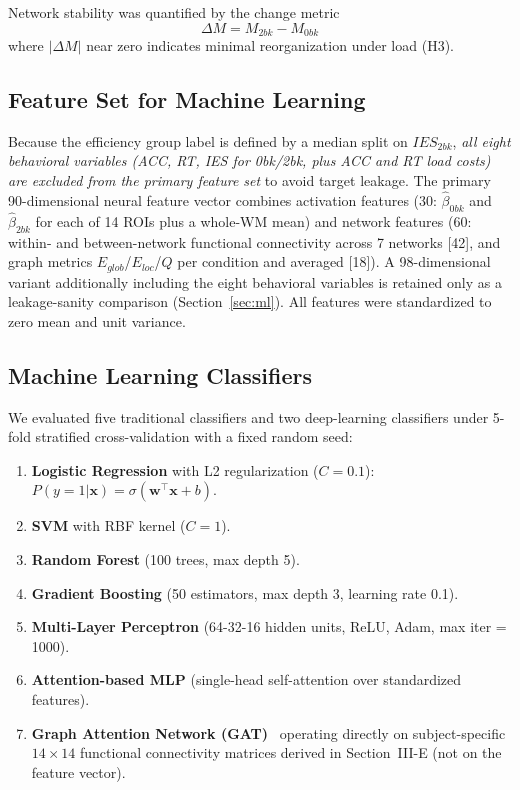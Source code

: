 \documentclass[conference]{IEEEtran}
\begin{document}
Network stability was quantified by the change metric
\begin{equation}
\Delta M = M_{2bk} - M_{0bk}
\end{equation}
where $|\Delta M|$ near zero indicates minimal reorganization under load (H3).

\subsection{Feature Set for Machine Learning}
\label{sec:mlfeatures}
Because the efficiency group label is defined by a median split on $IES_{2bk}$, \emph{all eight behavioral variables (ACC, RT, IES for 0bk/2bk, plus ACC and RT load costs) are excluded from the primary feature set} to avoid target leakage. The primary 90-dimensional neural feature vector combines activation features (30: $\hat{\beta}_{0bk}$ and $\hat{\beta}_{2bk}$ for each of 14 ROIs plus a whole-WM mean) and network features (60: within- and between-network functional connectivity across 7 networks [42], and graph metrics $E_{glob}$/$E_{loc}$/$Q$ per condition and averaged [18]). A 98-dimensional variant additionally including the eight behavioral variables is retained only as a leakage-sanity comparison (Section~\ref{sec:ml}). All features were standardized to zero mean and unit variance.

\subsection{Machine Learning Classifiers}
We evaluated five traditional classifiers and two deep-learning classifiers under 5-fold stratified cross-validation with a fixed random seed:
\begin{enumerate}
  \item \textbf{Logistic Regression} with L2 regularization ($C=0.1$):
  $P(y=1|\mathbf{x}) = \sigma(\mathbf{w}^{\!\top}\mathbf{x}+b)$.
  \item \textbf{SVM} with RBF kernel ($C=1$).
  \item \textbf{Random Forest} (100 trees, max depth 5).
  \item \textbf{Gradient Boosting} (50 estimators, max depth 3, learning rate 0.1).
  \item \textbf{Multi-Layer Perceptron} (64-32-16 hidden units, ReLU, Adam, max iter = 1000).
  \item \textbf{Attention-based MLP} (single-head self-attention over standardized features).
  \item \textbf{Graph Attention Network (GAT)}~\cite{velickovic2017graph} operating directly on subject-specific $14\times14$ functional connectivity matrices derived in Section~III-E (not on the feature vector).
\end{enumerate}
\end{document}
